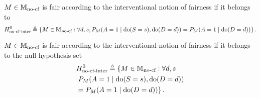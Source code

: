 \ifdefined\SINGLE
\begin{definition}
    $M \in \mathbb{M}_{\text{no-cf}}$ is fair according to the interventional notion of fairness if it belongs to 
     \begin{equation*}\label{eq:interfairunconf}
    H^0_{\text{no-cf-inter}} \triangleq \left \lbrace M \in \mathbb{M}_{\text{no-cf}}: \forall d,s, P_{M}{\left({A=1\mid\text{do}(S=s),\text{do}(D=d)}\right)} = P_{M}{\left({A=1\mid\text{do}(D = d)}\right)} \right \rbrace.
    \end{equation*}
    \end{definition}
\else
\begin{definition}
    $M \in \mathbb{M}_{\text{no-cf}}$ is fair according to the interventional notion of fairness if it belongs to the null hypothesis set 
     \begin{align*}\label{eq:interfairunconf}
    &H^0_{\text{no-cf-inter}} \triangleq \left \lbrace M \in \mathbb{M}_{\text{no-cf}}: \forall d,s \right. \nonumber\\
   & \left. P_{M}{\left({A=1\mid\text{do}(S=s),\text{do}(D=d)}\right)} \right. \nonumber\\
   &\left. = P_{M}{\left({A=1\mid\text{do}(D = d)}\right)} \right \rbrace.
    \end{align*}
\end{definition}
\fi

